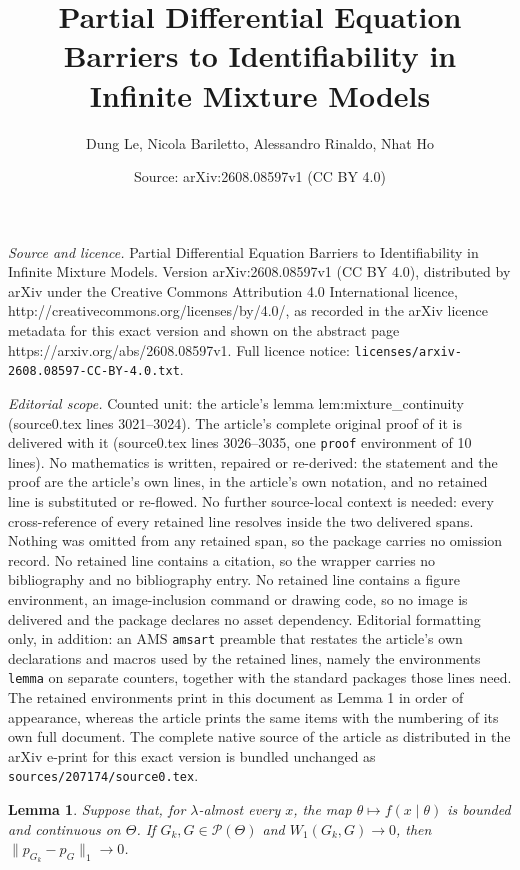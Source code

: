 \documentclass[10pt,a4paper]{amsart}
\title{Partial Differential Equation Barriers to Identifiability in Infinite Mixture Models}
\author{Dung Le, Nicola Bariletto, Alessandro Rinaldo, Nhat Ho}
\date{Source: arXiv:2608.08597v1 (CC BY 4.0)}
\newtheorem{lemma}{Lemma}
\begin{document}
\maketitle

\noindent\emph{Source and licence.} Partial Differential Equation Barriers to Identifiability in Infinite Mixture Models. Version arXiv:2608.08597v1 (CC BY 4.0), distributed by arXiv under the Creative Commons Attribution 4.0 International licence, http://creativecommons.org/licenses/by/4.0/, as recorded in the arXiv licence metadata for this exact version and shown on the abstract page https://arxiv.org/abs/2608.08597v1. Full licence notice: \texttt{licenses/arxiv-2608.08597-CC-BY-4.0.txt}.\par\smallskip

\noindent\textit{Editorial scope.} Counted unit: the article's lemma lem:mixture\_continuity (source0.tex lines 3021--3024). The article's complete original proof of it is delivered with it (source0.tex lines 3026--3035, one \texttt{proof} environment of 10 lines). No mathematics is written, repaired or re-derived: the statement and the proof are the article's own lines, in the article's own notation, and no retained line is substituted or re-flowed.  No further source-local context is needed: every cross-reference of every retained line resolves inside the two delivered spans.  Nothing was omitted from any retained span, so the package carries no omission record.  No retained line contains a citation, so the wrapper carries no bibliography and no bibliography entry.  No retained line contains a figure environment, an image-inclusion command or drawing code, so no image is delivered and the package declares no asset dependency.  Editorial formatting only, in addition: an AMS \texttt{amsart} preamble that restates the article's own declarations and macros used by the retained lines, namely the environments \texttt{lemma} on separate counters, together with the standard packages those lines need.  The retained environments print in this document as Lemma 1 in order of appearance, whereas the article prints the same items with the numbering of its own full document.  The complete native source of the article as distributed in the arXiv e-print for this exact version is bundled unchanged as \texttt{sources/207174/source0.tex}.
\begin{lemma}\label{lem:mixture_continuity}
Suppose that, for $\lambda$-almost every $x$, the map $\theta\mapsto f(x\mid\theta)$ is bounded and continuous on
$\Theta$. If $G_k,G\in\mathcal P(\Theta)$ and $W_1(G_k,G)\to0$, then $\|p_{G_k}-p_G\|_1\to0$.
\end{lemma}
\end{document}
